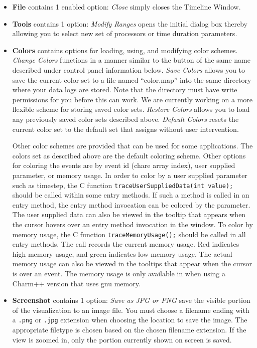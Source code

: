 \documentclass[10pt]{report}
\begin{document}
\begin{itemize}
\item {\bf File} contains 1 enabled option: 
{\it Close} simply closes the Timeline Window.
\item {\bf Tools} contains 1 option: {\it Modify Ranges} opens the initial 
dialog box thereby allowing you to select new set of processors or time duration
parameters.
\item {\bf Colors} contains options for loading, using, and modifying color schemes. {\it Change Colors} functions in
a manner similar to the button of the same name described under control 
panel information below. {\it Save Colors} allows you to save the current
color set to a file named ``color.map'' into the same directory where your
data logs are stored. Note that the directory must have write permissions
for you before this can work. We are currently working on a more flexible
scheme for storing saved color sets. {\it Restore Colors} allows you to
load any previously saved color sets described above. {\it Default Colors}
resets the current color set to the default set that \projections{} assigns
without user intervention.

Other color schemes are provided that can be used for some applications. The colors set as described above are the default coloring scheme. Other options for coloring the events are by event id (chare array index), user supplied parameter, or memory usage. In order to color by a user supplied parameter such as timestep, the C function  \texttt{traceUserSuppliedData(int value);} should be called within some entry methods. If such a method is called in an entry method, the entry method invocation can be colored by the parameter. The user supplied data can also be viewed in the tooltip that appears when the cursor hovers over an entry method invocation in the window. To color by memory usage, the C function \texttt{traceMemoryUsage();} should be called in all entry methods. The call records the current memory usage. Red indicates high memory usage, and green indicates low memory usage. The actual memory usage can also be viewed in the tooltips that appear when the cursor is over an event. The memory usage is only available in when using a Charm++ version that uses gnu memory.


\item {\bf Screenshot} contains 1 option: 
{\it Save as JPG or PNG} save the visible portion of the visualization
to an image file. You must choose a filename ending with a \texttt{.png}
or \texttt{.jpg} extension when choosing the location to save the image. The
appropriate filetype is chosen based on the chosen filename
extension. If the view is zoomed in, only the portion currently shown
on screen is saved.

\end{itemize}
\end{document}
